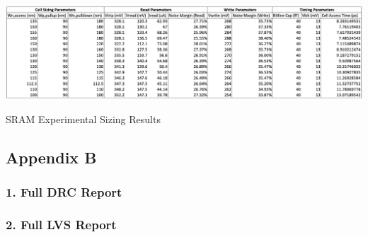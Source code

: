 \documentclass[10pt,letterpaper,onecolumn]{article}
\begin{document}
\begin{table}[htp]
\centering
\includegraphics[clip,width=\columnwidth]{Problem2-Table1.png}
\caption{SRAM Experimental Sizing Results}
\label{table:SRAM_test-sizing}
\end{table}

\clearpage
\subsection*{Appendix B}

\subsubsection*{1. Full DRC Report}

\begingroup
\obeylines
%
\endgroup%

\subsubsection*{2. Full LVS Report}

\begingroup
\obeylines
%
\endgroup%
\end{document}

